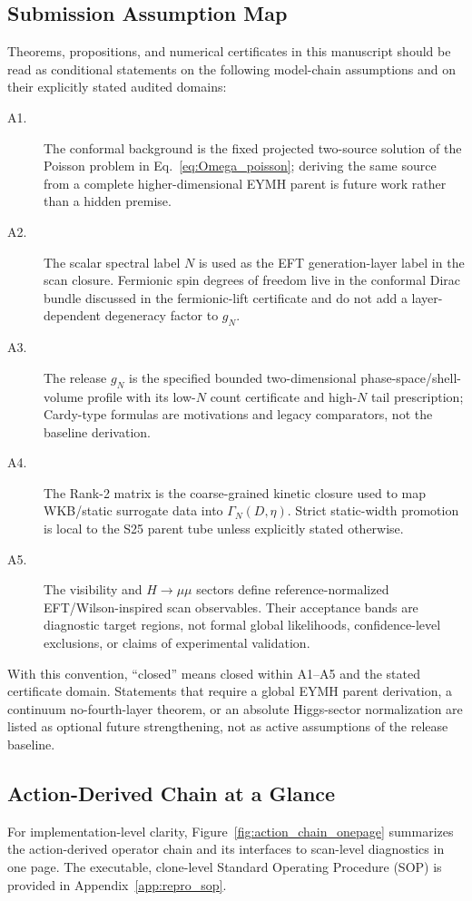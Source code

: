 \documentclass[aps,prd,onecolumn,notitlepage,nofootinbib,superscriptaddress,11pt,floatfix]{revtex4-2}
\begin{document}
\subsection{Submission Assumption Map}
\label{sec:submission_assumptions}
Theorems, propositions, and numerical certificates in this manuscript should be read as conditional statements on the following model-chain assumptions and on their explicitly stated audited domains:
\begin{description}
    \item[A1.] The conformal background is the fixed projected two-source solution of the Poisson problem in Eq.~\eqref{eq:Omega_poisson}; deriving the same source from a complete higher-dimensional EYMH parent is future work rather than a hidden premise.
    \item[A2.] The scalar spectral label \(N\) is used as the EFT generation-layer label in the scan closure.  Fermionic spin degrees of freedom live in the conformal Dirac bundle discussed in the fermionic-lift certificate and do not add a layer-dependent degeneracy factor to \(g_N\).
    \item[A3.] The release \(g_N\) is the specified bounded two-dimensional phase-space/shell-volume profile with its low-\(N\) count certificate and high-\(N\) tail prescription; Cardy-type formulas are motivations and legacy comparators, not the baseline derivation.
    \item[A4.] The Rank-2 matrix is the coarse-grained kinetic closure used to map WKB/static surrogate data into \(\Gamma_N(D,\eta)\).  Strict static-width promotion is local to the S25 parent tube unless explicitly stated otherwise.
    \item[A5.] The visibility and \(H\to\mu\mu\) sectors define reference-normalized EFT/Wilson-inspired scan observables.  Their acceptance bands are diagnostic target regions, not formal global likelihoods, confidence-level exclusions, or claims of experimental validation.
\end{description}
With this convention, ``closed'' means closed within A1--A5 and the stated certificate domain.  Statements that require a global EYMH parent derivation, a continuum no-fourth-layer theorem, or an absolute Higgs-sector normalization are listed as optional future strengthening, not as active assumptions of the release baseline.

\subsection{Action-Derived Chain at a Glance}
\label{sec:action_chain_glance}
For implementation-level clarity, Figure~\ref{fig:action_chain_onepage} summarizes the action-derived operator chain and its interfaces to scan-level diagnostics in one page. The executable, clone-level Standard Operating Procedure (SOP) is provided in Appendix~\ref{app:repro_sop}.
\end{document}
